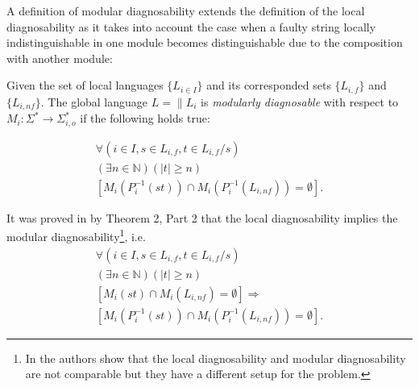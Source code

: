 \documentclass[a4paper, 10pt, conference]{ieeeconf}
\begin{document}
A definition of modular diagnosability extends the definition of the local
diagnosability as it takes into account the case when a faulty string locally
indistinguishable in one module becomes distinguishable due to the
composition with another module:

\begin{definition} Given the set of local languages
$\{L_{i \in I}\}$ and its corresponded sets $\{L_{i,f}\}$ and
$\{L_{i,nf}\}$. The global language $L = \parallel L_i$ is \emph{modularly
diagnosable} with respect to
$M_i: \Sigma^* \rightarrow \Sigma_{i,o}^*$ 
if the following holds true:
\end{definition}
\begin{equation}
\begin{array}{l}
	\forall(i \in I, s \in L_{i,f}, t \in L_{i,f}/s)
	\\
	(\exists n \in \mathbb{N})
	(|t| \geq n)
	\\
	\left[ M_i(P_i^{-1}(st)) \cap M_i(P_i^{-1}(L_{i,nf})) = \emptyset \right].
\end{array}
\end{equation}

It was proved in \cite{contant_diagnosability_2006} by Theorem 2, Part 2 
that the local diagnosability implies the modular diagnosability\footnote{In
\cite{zhou_decentralized_2008} the authors show that the local diagnosability
and modular diagnosability are not comparable but they have a different setup
for the problem.}, i.e.
\begin{equation}
\begin{array}{l}
	\forall(i \in I, s \in L_{i,f}, t \in L_{i,f}/s)
	\\
	(\exists n \in \mathbb{N})
	(|t| \geq n)
	\\
	\left[ M_i(st) \cap M_i(L_{i,nf}) = \emptyset \right]
	\Rightarrow 
	\\ 
	\left[ M_i(P_i^{-1}(st)) \cap M_i(P_i^{-1}(L_{i,nf})) = \emptyset \right].
\end{array}
\end{equation}
\end{document}
